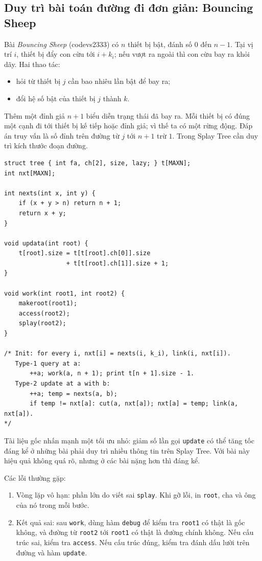 \documentclass[11pt]{article}
\begin{document}
\subsection{Duy trì bài toán đường đi đơn giản: Bouncing Sheep}

Bài \textit{Bouncing Sheep} (codevs2333) có $n$ thiết bị bật, đánh số
$0$ đến $n-1$.  Tại vị trí $i$, thiết bị đẩy con cừu tới $i+k_i$; nếu vượt ra
ngoài thì con cừu bay ra khỏi dãy.  Hai thao tác:
\begin{itemize}
  \item hỏi từ thiết bị $j$ cần bao nhiêu lần bật để bay ra;
  \item đổi hệ số bật của thiết bị $j$ thành $k$.
\end{itemize}

Thêm một đỉnh giả $n+1$ biểu diễn trạng thái đã bay ra.  Mỗi thiết bị có đúng
một cạnh đi tới thiết bị kế tiếp hoặc đỉnh giả; vì thế ta có một rừng động.
Đáp án truy vấn là số đỉnh trên đường từ $j$ tới $n+1$ trừ $1$.  Trong Splay
Tree cần duy trì kích thước đoạn đường.

\begingroup
\small
\begin{verbatim}
struct tree { int fa, ch[2], size, lazy; } t[MAXN];
int nxt[MAXN];

int nexts(int x, int y) {
    if (x + y > n) return n + 1;
    return x + y;
}

void updata(int root) {
    t[root].size = t[t[root].ch[0]].size
                 + t[t[root].ch[1]].size + 1;
}

void work(int root1, int root2) {
    makeroot(root1);
    access(root2);
    splay(root2);
}

/* Init: for every i, nxt[i] = nexts(i, k_i), link(i, nxt[i]).
   Type-1 query at a:
       ++a; work(a, n + 1); print t[n + 1].size - 1.
   Type-2 update at a with b:
       ++a; temp = nexts(a, b);
       if temp != nxt[a]: cut(a, nxt[a]); nxt[a] = temp; link(a, nxt[a]).
*/
\end{verbatim}
\endgroup

Tài liệu gốc nhấn mạnh một tối ưu nhỏ: giảm số lần gọi \texttt{update} có thể
tăng tốc đáng kể ở những bài phải duy trì nhiều thông tin trên Splay Tree.  Với
bài này hiệu quả không quá rõ, nhưng ở các bài nặng hơn thì đáng kể.

Các lỗi thường gặp:
\begin{enumerate}
  \item Vòng lặp vô hạn: phần lớn do viết sai \texttt{splay}.  Khi gỡ lỗi, in
  \texttt{root}, cha và ông của nó trong mỗi bước.
  \item Kết quả sai: sau \texttt{work}, dùng hàm \texttt{debug} để kiểm tra
  \texttt{root1} có thật là gốc không, và đường từ \texttt{root2} tới
  \texttt{root1} có thật là đường chính không.  Nếu cấu trúc sai, kiểm tra
  \texttt{access}.  Nếu cấu trúc đúng, kiểm tra đánh dấu lười trên đường và
  hàm \texttt{update}.
\end{enumerate}
\end{document}
